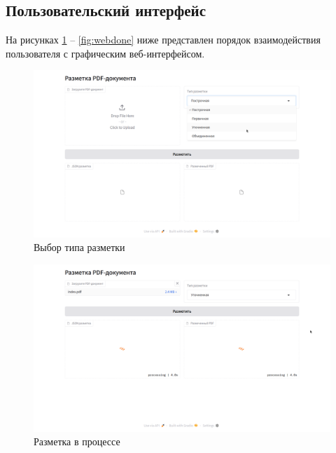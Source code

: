 \newpage

\subsection{Пользовательский интерфейс}


На рисунках \ref{fig:webstart} -- \ref{fig:webdone} ниже представлен порядок взаимодействия пользователя с графическим веб-интерфейсом.

\begin{figure}[H]
	\centering
	\includegraphics[width=\textwidth]{img/web-start.png}
    \caption{Выбор типа разметки}
	\label{fig:webstart}
\end{figure}

\begin{figure}[H]
	\centering
	\includegraphics[width=\textwidth]{img/web-process.png}
    \caption{Разметка в процессе}
	\label{fig:webproc}
\end{figure}

